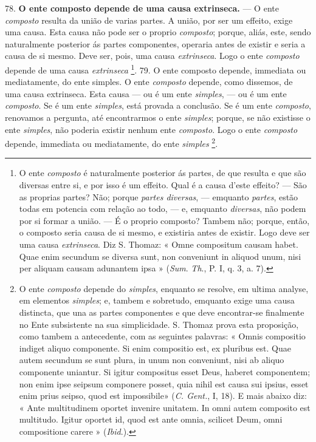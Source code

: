 78. \textbf{O ente composto depende de uma causa extrinseca.} --- O ente \emph{composto} resulta da união de varias partes. A união, por ser um effeito, exige uma causa. Esta causa não pode ser o proprio \emph{composto}; porque, aliás, este, sendo naturalmente posterior ás partes componentes, operaria antes de existir e seria a causa de si mesmo. Deve ser, pois, uma causa \emph{extrinseca}. Logo o ente \emph{composto} depende de uma causa \emph{extrinseca} \footnote{O ente \emph{composto} é naturalmente posterior ás partes, de que resulta e que são diversas entre si, e por isso é um effeito. Qual é a causa d'este effeito? --- São as proprias partes? Não; porque \emph{partes diversas}, --- emquanto \emph{partes}, estão todas em potencia com relação ao todo, --- e, emquanto \emph{diversas}, não podem por si formar a união. --- É o proprio composto? Tambem não; porque, então, o composto seria causa de si mesmo, e existiria antes de existir. Logo deve ser uma causa \emph{extrinseca}. Diz S. Thomaz: « Omne compositum causam habet. Quae enim secundum se diversa sunt, non conveniunt in aliquod unum, nisi per aliquam causam adunantem ipsa » (\emph{Sum}. \emph{Th}., P. I, q. 3, a. 7).}.
 79. O ente composto depende, immediata ou mediatamente, do ente simples. O ente \emph{composto} depende, como dissemos, de uma causa extrinseca. Esta causa --- ou é um ente \emph{simples}, --- ou é um ente \emph{composto}. Se é um ente \emph{simples}, está provada a conclusão. Se é um ente \emph{composto}, renovamos a pergunta, até encontrarmos o ente \emph{simples}; porque, se não existisse o ente \emph{simples}, não poderia existir nenhum ente \emph{composto}. Logo o ente \emph{composto} depende, immediata ou mediatamente, do ente \emph{simples} \footnote{O ente \emph{composto} depende do \emph{simples}, enquanto se resolve, em ultima analyse, em elementos \emph{simples}; e, tambem e sobretudo, emquanto exige uma causa distincta, que una as partes componentes e que deve encontrar-se finalmente no Ente subsistente na sua simplicidade. S. Thomaz prova esta proposição, como tambem a antecedente, com as seguintes palavras: « Omnis compositio indiget aliquo componente. Si enim compositio est, ex pluribus est. Quae autem secundum se sunt plura, in unum non conveniunt, nisi ab aliquo componente uniantur. Si igitur compositus esset Deus, haberet componentem; non enim ipse seipsum componere posset, quia nihil est causa sui ipsius, esset enim prius seipso, quod est impossibile» (\emph{C. Gent.}, I, 18). E mais abaixo diz: « Ante multitudinem oportet invenire unitatem. In omni autem composito est multitudo. Igitur oportet id, quod est ante omnia, scilicet Deum, omni compositione carere » (\emph{Ibid}.).}.

